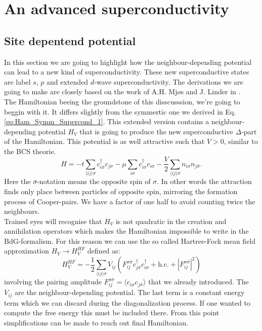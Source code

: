 \documentclass[../main.tex]{subfile}
\begin{document}
\section{An advanced superconductivity}
\subsection{Site depentend potential}
In this section we are going to highlight how the neighbour-depending potential can lead to a new kind of superconductivity.
These new superconductive states are label $s$, $p$ and extended $d$-wave superconductivity. The derivations we are going to make are closely based on
the work of A.H. Mjøs and J. Linder in \cite{Mjos2019}.\\

The Hamiltonian beeing the groundstone of this 
disscusssion, we're going to beggin with it. It differs slightly from the symmertic one we derived in Eq.\ref{eq:Ham_Symm_Supercond_1}. This extended version contains a neighbour-depending potential $H_V$ that is going to 
produce the new superconductive $\Delta$-part of the Hamiltonian. This potential is as well attractive such that $V>0$, similar to the BCS theorie.
\begin{equation}
    H = -t\sum_{\langle ij\rangle \sigma} c_{i\sigma}^{\dagger}c_{j\sigma} - \mu \sum_{i\sigma} c_{i\sigma}^{\dagger}c_{i\sigma} - \frac{V}{2} \sum_{\langle ij\rangle \sigma} n_{i\sigma}n_{j\bar{\sigma}}.
\end{equation}
Here the $\bar{\sigma}$-notation means the opposite spin of $\sigma$. In other words the attraction finds only place between particles of opposite spin, mirroring the formation process of Cooper-pairs.
We have a factor of one half to avoid counting twice the neighbours.\\

Trained eyes will recognise that $H_V$ is not quadratic in the creation and annihilation operators which makes the Hamiltonian impossible to write in the BdG-formalism. For this reason we can 
use the so called Hartree-Fock mean field approximation $H_V \rightarrow H^{HF}_V$ defined as:
\begin{equation}
    H^{HF}_V = -\frac{1}{2} \sum_{\langle ij\rangle \sigma} V_{ij} \left(F_{ij}^{\sigma \bar{\sigma}} c^{\dagger}_{j\bar{\sigma}}c^{\dagger}_{i\sigma} + \text{h.c.} + |F_{ij}^{\sigma \bar{\sigma}}|^2\right)
\end{equation}
involving the pairing amplitude $F_{ij}^{\sigma \bar{\sigma}} = \langle c_{i\sigma}c_{j\bar{\sigma}}\rangle$ that we already introduced. The $V_{ij}$ are the neighbour-depending potential.
The last term is a constant energy term which we can discard during the diagonalization process. If one wanted to compute the free energy this must be included there. From this point simplifications
can be made to reach out final Hamiltonian.\\
\end{document}
